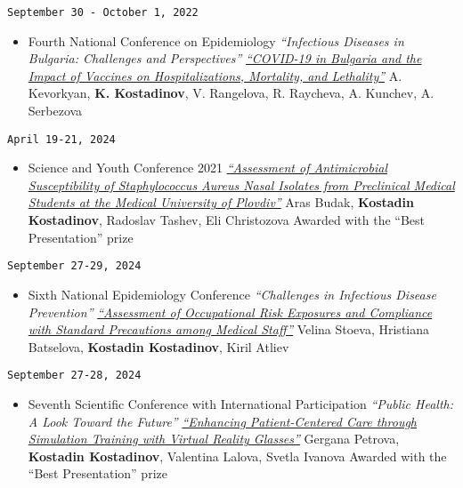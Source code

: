 \documentclass[
  12pt,
  letterpaper,
  DIV=11,
  numbers=noendperiod]{scrartcl}
\providecommand{\tightlist}{%
  \setlength{\itemsep}{0pt}\setlength{\parskip}{0pt}}\usepackage{longtable,booktabs,array}
\begin{document}
\texttt{September\ 30\ -\ October\ 1,\ 2022}

\begin{itemize}
\tightlist
\item
  Fourth National Conference on Epidemiology \textbar{}
  \emph{``Infectious Diseases in Bulgaria: Challenges and
  Perspectives''} \textbar{}
  \href{http://bulepid.org/_upload2018/PROGRAMA\%202022-pre-final\%20-\%20Copy.pdf}{\emph{``COVID-19
  in Bulgaria and the Impact of Vaccines on Hospitalizations, Mortality,
  and Lethality''}} \textbar{} A. Kevorkyan, \textbf{K. Kostadinov}, V.
  Rangelova, R. Raycheva, A. Kunchev, A. Serbezova
\end{itemize}

\texttt{April\ 19-21,\ 2024}

\begin{itemize}
\tightlist
\item
  Science and Youth Conference 2021 \textbar{}
  \href{https://asclepius.bg/cnm/wp-content/uploads/2024/04/SY-DMS-2024-abstracts-web.pdf}{\emph{``Assessment
  of Antimicrobial Susceptibility of Staphylococcus Aureus Nasal
  Isolates from Preclinical Medical Students at the Medical University
  of Plovdiv''}} \textbar{} Aras Budak, \textbf{Kostadin Kostadinov},
  Radoslav Tashev, Eli Christozova \textbar{} Awarded with the ``Best
  Presentation'' prize
\end{itemize}

\texttt{September\ 27-29,\ 2024}

\begin{itemize}
\tightlist
\item
  Sixth National Epidemiology Conference \textbar{} \emph{``Challenges
  in Infectious Disease Prevention''} \textbar{}
  \href{http://bulepid.org/_upload2018/PROGRAMA\%202024-final.pdf}{\emph{``Assessment
  of Occupational Risk Exposures and Compliance with Standard
  Precautions among Medical Staff''}} \textbar{} Velina Stoeva,
  Hristiana Batselova, \textbf{Kostadin Kostadinov}, Kiril Atliev
\end{itemize}

\texttt{September\ 27-28,\ 2024}

\begin{itemize}
\tightlist
\item
  Seventh Scientific Conference with International Participation
  \textbar{} \emph{``Public Health: A Look Toward the Future''}
  \textbar{}
  \href{https://publisher.mu-plovdiv.bg/wp-content/uploads/published-online/public-health-conf/2024/abstract-book.html\#p=56}{\emph{``Enhancing
  Patient-Centered Care through Simulation Training with Virtual Reality
  Glasses''}} \textbar{} Gergana Petrova, \textbf{Kostadin Kostadinov},
  Valentina Lalova, Svetla Ivanova \textbar{} Awarded with the ``Best
  Presentation'' prize
\end{itemize}
\end{document}
